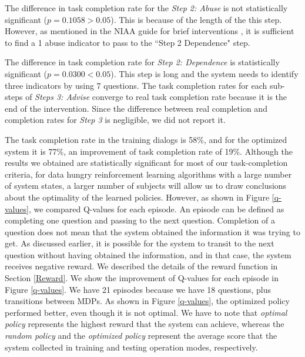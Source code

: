\begin{sloppy}
The difference in task completion rate for the {\em Step 2: Abuse} is not statistically significant ($p=0.1058>0.05$).  This is because of the length of the this step. However, as mentioned in the NIAA guide for brief interventions \cite{national2006niaaa}, it is sufficient to find a 1 abuse indicator to pass to the ``Step 2 Dependence" step. 

The difference in task completion rate for {\em Step 2: Dependence} is statistically significant ($p=0.0300<0.05$).  This step is long and the system needs to identify three indicators by using 7 questions. The task completion rates for each sub-steps of {\em Steps 3: Advise} converge to real task completion rate because it is the end of the intervention. Since the difference between real completion and completion rates for \textit{Step 3} is negligible, we did not report it.
 
The task completion rate in the training dialogs is 58\%, and for the optimized system it is 77\%, an improvement of task completion rate of 19\%. Although the results we obtained are statistically significant for most of our task-completion criteria, for data hungry reinforcement learning algorithms with a large number of system states, a larger number of subjects will allow us to draw conclusions about the optimality of the learned policies. However, as shown in Figure \ref{q-values}, we compared Q-values for each episode. An episode can be defined as completing one question and passing to the next question. Completion of a question does not mean that the system obtained the information it was trying to get. As discussed earlier, it is possible for the system to transit to the next question without having obtained the information, and in that case, the system receives negative reward. We described the details of the reward function in Section \ref{Reward}. We show the improvement of Q-values for each episode in Figure \ref{q-values}. We have  21 episodes because we have 18 questions, plus transitions between MDPs. As shown in Figure \ref{q-values}, the optimized policy performed better, even though it is not optimal. We have to note that \textit{optimal policy} represents the highest reward that the system can achieve, whereas the \textit{random policy} and the \textit{optimized policy} represent the average score that the system collected in training and testing operation modes, respectively.


\end{sloppy}
